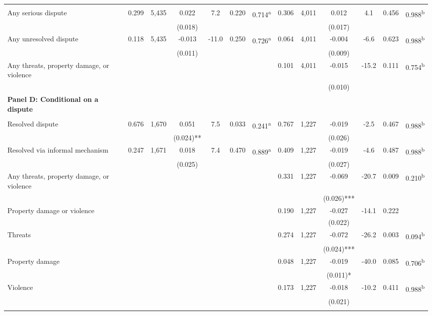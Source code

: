 \begin{tabular}{lcccccccccccc}
 &  &  &  &  &  &  &  &  &  &  &  & \\
Any serious dispute & 0.299 & 5,435 & 0.022 & 7.2 & 0.220 & 0.714\textsuperscript{a} & 0.306 & 4,011 & 0.012 & 4.1 & 0.456 & 0.988\textsuperscript{b}\\
 &  &  & (0.018) &  &  &  &  &  & (0.017) &  &  & \\
Any unresolved dispute & 0.118 & 5,435 & -0.013 & -11.0 & 0.250 & 0.726\textsuperscript{a} & 0.064 & 4,011 & -0.004 & -6.6 & 0.623 & 0.988\textsuperscript{b}\\
 &  &  & (0.011) &  &  &  &  &  & (0.009) &  &  & \\
\phantom{} Any threats, property damage, or violence &  &  &  &  &  &  & 0.101 & 4,011 & -0.015 & -15.2 & 0.111 & 0.754\textsuperscript{b}\\
 &  &  &  &  &  &  &  &  & (0.010) &  &  & \\
\textbf{Panel D: Conditional on a dispute} &  &  &  &  &  &  &  &  &  &  &  & \\
 &  &  &  &  &  &  &  &  &  &  &  & \\
Resolved dispute & 0.676 & 1,670 & 0.051 & 7.5 & 0.033 & 0.241\textsuperscript{a} & 0.767 & 1,227 & -0.019 & -2.5 & 0.467 & 0.988\textsuperscript{b}\\
 &  &  & (0.024)** &  &  &  &  &  & (0.026) &  &  & \\
\quad Resolved via informal mechanism & 0.247 & 1,671 & 0.018 & 7.4 & 0.470 & 0.889\textsuperscript{a} & 0.409 & 1,227 & -0.019 & -4.6 & 0.487 & 0.988\textsuperscript{b}\\
 &  &  & (0.025) &  &  &  &  &  & (0.027) &  &  & \\
\phantom{} Any threats, property damage, or violence \phantom{} &  &  &  &  &  &  & 0.331 & 1,227 & -0.069 & -20.7 & 0.009 & 0.210\textsuperscript{b}\\
 &  &  &  &  &  &  &  &  & (0.026)*** &  &  & \\
\quad Property damage or violence \phantom{} &  &  &  &  &  &  & 0.190 & 1,227 & -0.027 & -14.1 & 0.222 & \\
 &  &  &  &  &  &  &  &  & (0.022) &  &  & \\
\quad Threats \phantom{} &  &  &  &  &  &  & 0.274 & 1,227 & -0.072 & -26.2 & 0.003 & 0.094\textsuperscript{b}\\
 &  &  &  &  &  &  &  &  & (0.024)*** &  &  & \\
\quad Property damage \phantom{} &  &  &  &  &  &  & 0.048 & 1,227 & -0.019 & -40.0 & 0.085 & 0.706\textsuperscript{b}\\
 &  &  &  &  &  &  &  &  & (0.011)* &  &  & \\
\quad Violence \phantom{} &  &  &  &  &  &  & 0.173 & 1,227 & -0.018 & -10.2 & 0.411 & 0.988\textsuperscript{b}\\
 &  &  &  &  &  &  &  &  & (0.021) &  &  & \\
\noalign{\smallskip}\hline\end{tabular}
